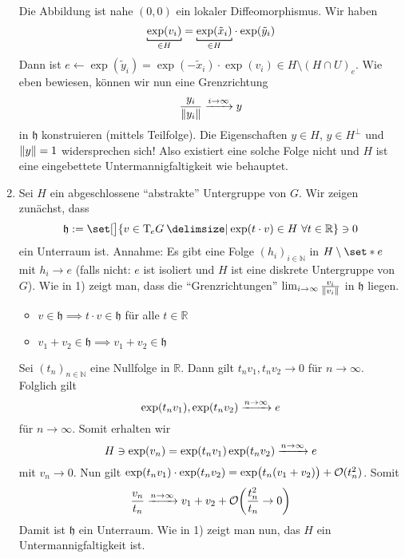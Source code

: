\begin{beweis}
\begin{enumerate}[1)]
		Die Abbildung 
		ist nahe $(0,0)$ ein lokaler Diffeomorphismus.
		Wir haben
		\[
			\Underbracket{\exp(v_i)}{\in H} = \Underbracket{\exp(\tilde{x}_i)}{\in H} \cdot \exp(\tilde{y}_i)
		\]
		Dann ist $e \longleftarrow  \exp(\tilde{y}_i) = \exp(- \tilde{x}_i) \cdot \exp(v_i) \in H \setminus (H \cap U)_e$.
		Wie eben bewiesen, können wir nun eine Grenzrichtung 
		\[
			\frac{y_i}{\norm*{y_i}} \grenzw{i \to \infty}  y
		\]
		in $\mathfrak{h}$ konstruieren (mittels Teilfolge).
		Die Eigenschaften $y \in H$, $y \in H^\bot$ und $\norm*{y}=1$ widersprechen sich!
		Also existiert eine solche Folge nicht und $H$ ist eine eingebettete Untermannigfaltigkeit wie behauptet.
		\item Sei $H$ ein abgeschlossene \enquote{abstrakte} Untergruppe von $G$.
		Wir zeigen zunächst, dass 
		\[
			\mathfrak{h} := \set[\big]{v \in \Tmap_e G \given \exp(t \cdot v) \in H \,\,\forall t \in \mathbb{R}} \ni 0
		\]
		ein Unterraum ist.
		Annahme: Es gibt eine Folge $(h_i)_{i \in \mathbb{N}}$ in $H \setminus \set*{e}$ mit $h_i \to e$ (falls nicht: $e$ ist isoliert und $H$ ist eine diskrete Untergruppe von $G$).
		Wie in 1) zeigt man, dass die \enquote{Grenzrichtungen} $\lim_{i \to \infty} \frac{v_i}{\norm*{v_i}}$ in $\mathfrak{h}$ liegen.
		\begin{itemize}[itemsep=0pt]
			\item $v \in \mathfrak{h} \implies t \cdot v \in \mathfrak{h}$ für alle $t \in \mathbb{R}$
			\item $v_1 + v_2 \in \mathfrak{h} \implies v_1 + v_2 \in \mathfrak{h}$
		\end{itemize}
		Sei $(t_n)_{n \in \mathbb{N}}$ eine Nullfolge in $\mathbb{R}$.
		Dann gilt $t_n v_1, t_n v_2 \to 0$ für $n \to \infty$.
		Folglich gilt 
		\[
			\exp(t_n v_1), \exp(t_n v_2) \grenzw{n \to \infty} e 
		\]
		für $n \to \infty$. Somit erhalten wir
		\[
			H \ni \exp(v_n) = \exp \enbrace*{t_n v_1} \exp(t_n v_2) \grenzw{n \to \infty} e
		\]
		mit $v_n \to 0$.
		Nun gilt $\exp(t_n v_1) \cdot \exp(t_n v_2) = \exp \enbrace[\big]{t_n(v_1 + v_2)} + \mathcal{O}(t_n^2)$.
		Somit
		\[
			\frac{v_n}{t_n} \grenzw{n \to \infty} v_1 +v_2 + \mathcal{O} \enbrace*{\frac{t_n^2}{t_n} \to 0 } 
		\]
		Damit ist $\mathfrak{h}$ ein Unterraum.
		Wie in 1) zeigt man nun, das $H$ ein Untermannigfaltigkeit ist.\qedhere
	\end{enumerate}
\end{beweis}

